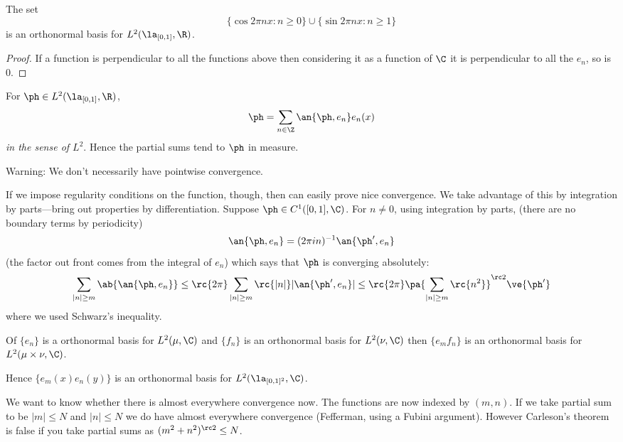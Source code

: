 \begin{cor}
The set
\[
\{\cos 2\pi nx:n\ge 0\}\cup \{\sin 2\pi nx:n\ge 1\}
\]
is an orthonormal basis for $L^2(\la_{[0,1]},\R)$.
\end{cor}
\begin{proof}
If a function is perpendicular to all the functions above then considering it as a function of $\C$ it is perpendicular to all the $e_n$, so is 0.
\end{proof}
\begin{cor}
For $\ph\in L^2(\la_{[0,1]},\R)$,
\[
\ph=\sum_{n\in\Z} \an{\ph,e_n}e_n(x)
\]
{\it in the sense of $L^2$}. Hence the partial sums tend to $\ph$ in measure.
\end{cor}
Warning: We don't necessarily have pointwise convergence.

If we impose regularity conditions on the function, though, then can easily prove nice convergence. We take advantage of this by integration by parts---bring out properties by differentiation. 
Suppose $\ph\in C^1([0,1],\C)$. For $n\ne 0$, using integration by parts, (there are no boundary terms by periodicity)
\[
\an{\ph,e_n}=(2\pi in)^{-1}\an{\ph',e_n}
\]
(the factor out front comes from the integral of $e_n$) which says that $\ph$ is converging absolutely:
\[
\sum_{|n|\ge m} \ab{\an{\ph,e_n}}\le \rc{2\pi}\sum_{|n|\ge m} \rc{|n|} |\an{\ph',e_n}|\le \rc{2\pi}\pa{\sum_{|n|\ge m} \rc{n^2}}^{\rc 2}\ve{\ph'}
\]
where we used Schwarz's inequality.
\begin{thm}
Of $\{e_n\}$ is a orthonormal basis for $L^2(\mu,\C)$ and $\{f_n\}$ is an orthonormal basis for $L^2(\nu,\C)$ then $\{e_mf_n\}$ is an orthonormal basis for $L^2(\mu\times \nu,\C)$.
\end{thm}
Hence $\{e_m(x)e_n(y)\}$ is an orthonormal basis for $L^2(\la_{[0,1]^2},\C)$. 

We want to know whether there is almost everywhere convergence now. The functions are now indexed by $(m,n)$. If we take partial sum to be $|m|\le N$ and $|n|\le N$ we do have almost everywhere convergence (Fefferman, using a Fubini argument). However Carleson's theorem is false if you take partial sums as $(m^2+n^2)^{\rc 2}\le N$.